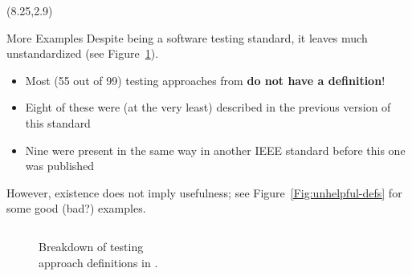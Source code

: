 \documentclass[22pt]{beamer}
\begin{document}
\begin{frame}[fragile]
    \begin{textblock}{7.25}(8.25,2.9)
        \begin{block}{\fontsize{37}{20}\selectfont More Examples}
            Despite \cite{IEEE2022} being a software testing standard, it
            leaves much unstandardized (see Figure~\ref{Fig:IEEEdefs}).
            \begin{itemize}
                \item Most (55 out of 99) testing approaches from \cite{IEEE2022}
                      \textbf{do not have a definition}!
                \item Eight of these were (at the very least) described in the
                      previous version of this standard \cite{IEEE2013}
                \item Nine were present in the same way in another IEEE
                      standard \cite{IEEE2017} before this one was published
            \end{itemize}
            \vspace{5mm}
            However, existence does not imply usefulness; see
            Figure~\ref{Fig:unhelpful-defs} for some good (bad?) examples.
            \vspace{-8mm}
            \begin{columns}
                \begin{column}{0.375\textwidth}
                    \begin{center}
                        \begin{figure}
                            \caption{Breakdown of testing\\approach definitions in
                                \cite{IEEE2022}.}
                            \label{Fig:IEEEdefs}
                        \end{figure}
                    \end{center}
                \end{column}

\end{columns}
\end{block}
\end{textblock}
\end{frame}
\end{document}
